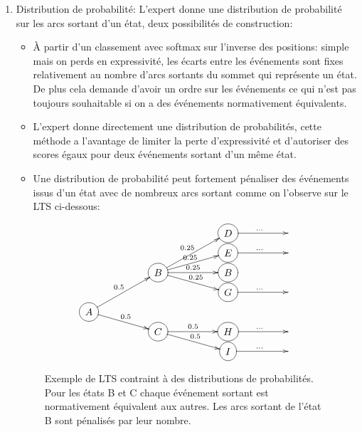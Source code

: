 \documentclass[11pt]{extarticle}
\begin{document}
 \begin{enumerate}
    \item Distribution de probabilité: L'expert donne une distribution de probabilité sur les arcs sortant d'un état, deux possibilités de construction:
        \begin{itemize}
            \item À partir d'un classement avec softmax sur l'inverse des positions: simple mais on perds en expressivité, les écarts entre les événements sont fixes relativement au nombre d'arcs sortants du sommet qui représente un état. De plus cela demande d'avoir un ordre sur les événements ce qui n'est pas toujours souhaitable si on a des événements normativement équivalents.
            \item L'expert donne directement une distribution de probabilités, cette méthode a l'avantage de limiter la perte d'expressivité et d'autoriser des scores égaux pour deux événements sortant d'un même état.
            \item Une distribution de probabilité peut fortement pénaliser des événements issus d'un état avec de nombreux arcs sortant comme on l'observe sur le LTS ci-dessous:
        \end{itemize}

        \begin{figure}[h!]\label{graph_prob}
            \centering
            \[
                \xymatrix @R=0.1em@C=5em {
                    & & *++[o][F-]{D} \ar[r]^{\dots} &
                \\ & & *++[o][F-]{E} \ar[r]^{\dots}&
                \\ & *++[o][F-]{B} \ar[ruu]^{0.25}\ar[ru]^{0.25}\ar[r]^{0.25}\ar[rd]^{0.25}& *++[o][F-]{B}&
                \\ & & *++[o][F-]{G} \ar[r]^{\dots}&
                \\  *++[o][F-]{A} \ar[ruu]^{0.5} \ar[rd]^{0.5}& & &
                \\ & *++[o][F-]{C}\ar[r]^{0.5} \ar[rd]^{0.5}&*++[o][F-]{H} \ar[r]^{\dots} &
                \\ & & *++[o][F-]{I} \ar[r]^{\dots}& 
                }            
            \]
            \captionsetup{width = 0.6\textwidth}
            \caption{Exemple de LTS contraint à des distributions de probabilités. Pour les états B et C chaque événement sortant est normativement équivalent aux autres. Les arcs sortant de l'état B sont pénalisés par leur nombre.}
            \label{fig:placeholder}
        \end{figure}


\end{enumerate}
\end{document}
